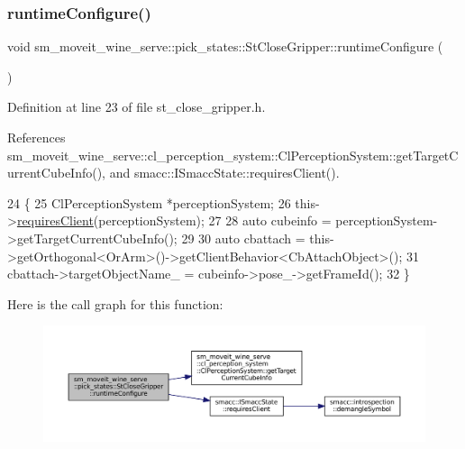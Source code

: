 \subsubsection{\texorpdfstring{runtime\+Configure()}{runtimeConfigure()}}
{\footnotesize\ttfamily void sm\+\_\+moveit\+\_\+wine\+\_\+serve\+::pick\+\_\+states\+::\+St\+Close\+Gripper\+::runtime\+Configure (\begin{DoxyParamCaption}{ }\end{DoxyParamCaption})\hspace{0.3cm}{\ttfamily [inline]}}



Definition at line 23 of file st\+\_\+close\+\_\+gripper.\+h.



References sm\+\_\+moveit\+\_\+wine\+\_\+serve\+::cl\+\_\+perception\+\_\+system\+::\+Cl\+Perception\+System\+::get\+Target\+Current\+Cube\+Info(), and smacc\+::\+I\+Smacc\+State\+::requires\+Client().


\begin{DoxyCode}
24          \{
25             ClPerceptionSystem *perceptionSystem;
26             this->\hyperlink{classsmacc_1_1ISmaccState_a7f95c9f0a6ea2d6f18d1aec0519de4ac}{requiresClient}(perceptionSystem);
27 
28             \textcolor{keyword}{auto} cubeinfo = perceptionSystem->getTargetCurrentCubeInfo();
29 
30             \textcolor{keyword}{auto} cbattach = this->getOrthogonal<OrArm>()->getClientBehavior<CbAttachObject>();
31             cbattach->targetObjectName\_ = cubeinfo->pose\_->getFrameId();
32          \}
\end{DoxyCode}
Here is the call graph for this function\+:
\nopagebreak
\begin{figure}[H]
\begin{center}
\leavevmode
\includegraphics[width=350pt]{structsm__moveit__wine__serve_1_1pick__states_1_1StCloseGripper_aa0c212f289581355c56da5bbfc97a5a7_cgraph}
\end{center}
\end{figure}
\mbox{\label{structsm__moveit__wine__serve_1_1pick__states_1_1StCloseGripper_a8c903b54bcbab92cb5943ea841ede6c4}} 
